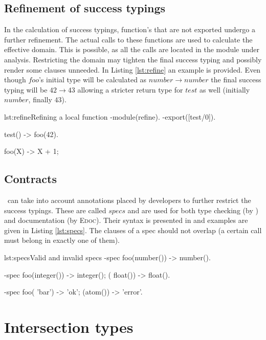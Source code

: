 \subsection{Refinement of success typings}

In the calculation of success typings, function's that are not
exported undergo a further refinement. The actual calls to these
functions are used to calculate the effective domain. This is
possible, as all the calls are located in the module under
analysis. Restricting the domain may tighten the final success typing
and possibly render some clauses unneeded. In Listing \ref{lst:refine}
an example is provided. Even though $foo$'s initial type will be
calculated as $number \rightarrow number$ the final success typing
will be $42 \rightarrow 43$ allowing a stricter return type for $test$
as well (initially $number$, finally $43$).

\begin{console}{lst:refine}{Refining a local function}
-module(refine).
-export([test/0]).

test() ->
  foo(42).

foo(X) -> X + 1;
\end{console}

\subsection{Contracts}

\dr\ can take into account annotations placed by developers to further
restrict the success typings. These are called $specs$ and are used
for both type checking (by \dr) and documentation (by
\mbox{\textsc{Edoc}})\cite{type_system}. Their syntax is presented in
\cite{type_system} and examples are given in Listing
\ref{lst:specs}. The clauses of a spec should not overlap (a certain
call must belong in exactly one of them).

\begin{console}{lst:specs}{Valid and invalid specs}
-spec foo(number()) -> number().

-spec foo(integer()) -> integer();
         (  float()) -> float().

-spec foo( 'bar') -> 'ok';
         (atom()) -> 'error'.
\end{console}

\section{Intersection types}
\label{sct:intersection_preliminaries}

